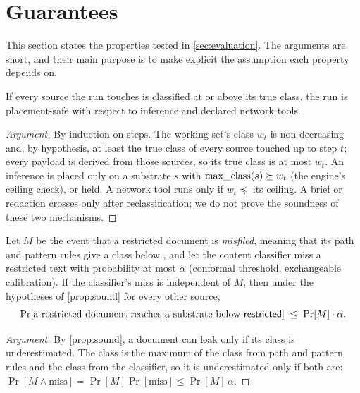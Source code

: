 \section{Guarantees}
\label{sec:guarantees}

This section states the properties tested in \cref{sec:evaluation}. The arguments are short,
and their main purpose is to make explicit the assumption each property depends on.

\begin{proposition}
\label{prop:sound}
If every source the run touches is classified at or above its true class, the run is
placement-safe with respect to inference and declared network tools.
\end{proposition}

\begin{proof}[Argument]
By induction on steps. The working set's class $w_t$ is non-decreasing and, by hypothesis, at
least the true class of every source touched up to step $t$; every payload is derived from
those sources, so its true class is at most $w_t$. An inference is placed only on a substrate
$s$ with $\operatorname{max\_class}(s) \succeq w_t$ (the engine's ceiling check), or held. A network tool runs
only if $w_t \preceq$ its ceiling. A brief or redaction crosses only after reclassification;
we do not prove the soundness of these two mechanisms.
\end{proof}

\begin{proposition}
\label{prop:leak}
Let $M$ be the event that a restricted document is \emph{misfiled}, meaning that its path and
pattern rules give a class below \res, and let the content classifier miss a restricted text with probability
at most $\alpha$ (conformal threshold, exchangeable calibration). If the classifier's miss is
independent of $M$, then under the hypotheses of \cref{prop:sound} for every other source,
\[
  \Pr[\text{a restricted document reaches a substrate below \textsf{restricted}}] \;\le\; \Pr[M]\cdot\alpha .
\]
\end{proposition}

\begin{proof}[Argument]
By \cref{prop:sound}, a document can leak only if its class is underestimated. The class is
the maximum of the class from path and pattern rules and the class from the classifier, so it
is underestimated only if both are: $\Pr[M \wedge \text{miss}] = \Pr[M]\Pr[\text{miss}] \le \Pr[M]\,\alpha$.
\end{proof}

